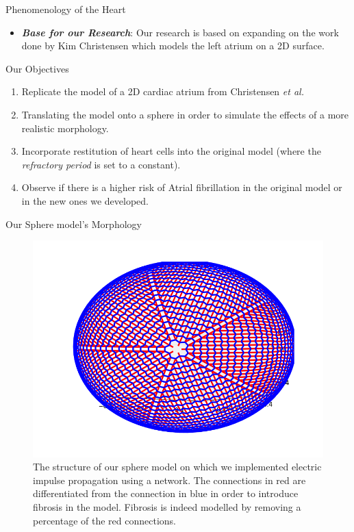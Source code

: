 \documentclass[final,hyperref={pdfpagelabels=false}]{beamer}
\begin{document}
\begin{frame}[t]
\begin{columns}[t]
\begin{column}{.465\textwidth}
\begin{block}{Phenomenology of the Heart}
\begin{itemize}
 \item \textbf{\textit{Base for our Research}}: Our research is based on expanding on the work done by Kim Christensen which models the left atrium on a 2D surface.
	\end{itemize}

\end{block}
\begin{block}{Our Objectives}

\begin{enumerate}
\item Replicate the model of a 2D cardiac atrium from Christensen \emph{et al.}
\item  Translating the model onto a sphere in order to simulate the effects of a more realistic morphology. 
\item Incorporate restitution of heart cells into the original model (where the \textit{refractory period} is set to a constant).
\item Observe if there is a higher risk of Atrial fibrillation in the original model or in the new ones we developed.
\end{enumerate}


\end{block}


\begin{block}{Our Sphere model's Morphology}

\begin{figure}
\includegraphics[width=0.7\linewidth]{connectome}
\caption{The structure of our sphere model on which we implemented electric impulse propagation using a network. The connections in red are differentiated from the connection in blue in order to introduce fibrosis in the model. Fibrosis is indeed modelled by removing a percentage of the red connections. }
\end{figure}


\end{block}
\end{column}
\end{columns}
\end{frame}
\end{document}
